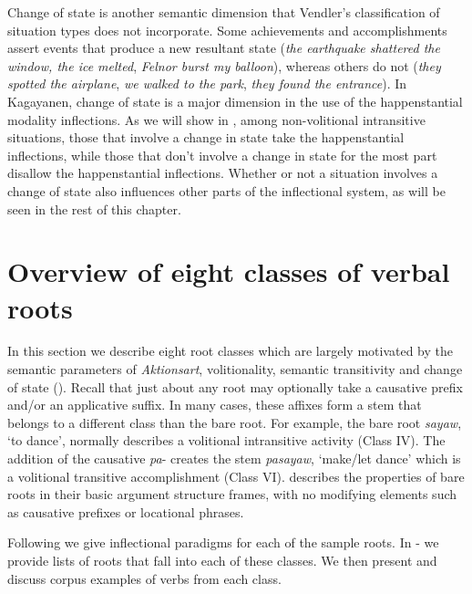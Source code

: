 Change of state is another semantic dimension that Vendler’s classification of situation types does not incorporate. Some achievements and accomplishments assert events that produce a new resultant state (\textit{the earthquake shattered the window, the ice melted}, \textit{Felnor burst my balloon}), whereas others do not (\textit{they spotted the airplane}, \textit{we walked to the park}, \textit{they found the entrance}). In Kagayanen, change of state is a major dimension in the use of the happenstantial modality inflections. As we will show in , among non-volitional intransitive situations, those that involve a change in state take the happenstantial inflections, while those that don’t involve a change in state for the most part disallow the happenstantial inflections. Whether or not a situation involves a change of state also influences other parts of the inflectional system, as will be seen in the rest of this chapter.

\section{Overview of eight classes of verbal roots}
\label{bkm:Ref149367537} \label{sec:overviewofeightverbclasses}

In this section we describe eight root classes which are largely motivated by the semantic parameters of \textit{Aktionsart}, volitionality, semantic transitivity and change of state (). Recall that just about any root may optionally take a causative prefix and/or an applicative suffix. In many cases, these affixes form a stem that belongs to a different class than the bare root. For example, the bare root \textit{sayaw}, ‘to dance’, normally describes a volitional intransitive activity (Class IV). The addition of the causative \textit{pa}{}- creates the stem \textit{pasayaw}, ‘make/let dance’ which is a volitional transitive accomplishment (Class VI).  describes the properties of bare roots in their basic argument structure frames, with no modifying elements such as causative prefixes or locational phrases.

Following  we give inflectional paradigms for each of the sample roots. In - we provide lists of roots that fall into each of these classes. We then present and discuss corpus examples of verbs from each class.

